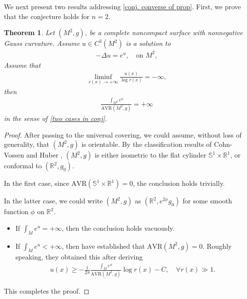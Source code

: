 \documentclass[12pt]{amsart}
\theoremstyle{plain}
\newtheorem{theorem}{Theorem}[section]
\theoremstyle{definition}
\theoremstyle{remark}     %
\begin{document}
We next present two results addressing \cref{conj. converse of prop}.
First, we prove that the conjecture holds for $n=2$.
\begin{theorem}\label{thm. converse for two dimensional}
    Let $(M^2,g)$, be a complete noncompact surface with nonnegative Gauss curvature. Assume $u\in C^3(M^2)$ is a solution to
    \begin{align*}
        -\Delta u=e^{u},\quad
        \text{on }M^2,
    \end{align*}
    Assume that
    \begin{align*}
        \liminf_{r(x)\to+\infty}
        \frac{u(x)}{\log r(x)}
        =-\infty,
    \end{align*}
    then
    \begin{align*}
        \frac{\int_{M^2}e^u}{\mathrm{AVR}(M^2,g)}=+\infty
    \end{align*}
    in the sense of \cref{two cases in conj}.
\end{theorem}
\begin{proof}
    After passing to the universal covering, we could assume, without loss of generality, that $(M^2,g)$ is orientable. 
    By the classification results of Cohn-Vossen \cite{C-V35} and Huber \cite{Hub57}, $(M^2,g)$ is either isometric to the flat cylinder $\mathbb{S}^1\times\mathbb{R}^1$, or conformal to $(\mathbb{R}^2,g_0)$.

    In the first case, since $\mathrm{AVR}(\mathbb{S}^1\times\mathbb{R}^1)=0$, the conclusion holds trivially.

    In the latter case, we could write $(M^2,g)$ as $(\mathbb{R}^2,e^{2\phi}g_0)$ for some smooth function $\phi$ on $\mathbb{R}^2$. 
    \begin{itemize}
        \item If $\int_M e^u=+\infty$, then the conclusion holds vacuously.
        \item If $\int_M e^u<+\infty$, then \cite[Proposition 2.3]{CL24} have established that $\mathrm{AVR}(M^2,g)=0$. Roughly speaking, they obtained this after deriving
        \begin{align*}
            u(x)\geq -\frac{1}{2\pi}\frac{\int_M e^u}{\mathrm{AVR}(M^2,g)}\log r(x)-C,\quad 
            \forall r(x)\gg 1.
        \end{align*}
    \end{itemize}
    This completes the proof.
\end{proof}
\end{document}
